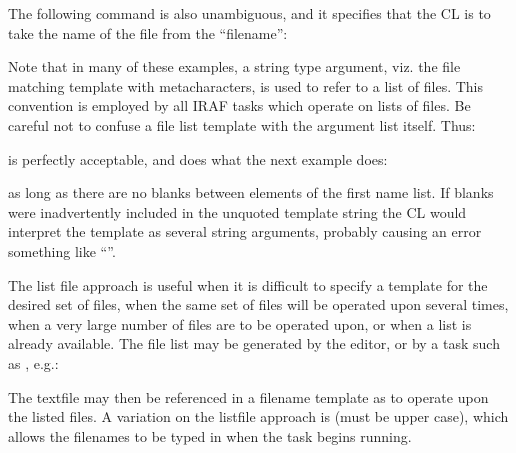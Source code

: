 The following command is also unambiguous, and it specifies that the CL
is to take the name of the file from the  ``filename'':

\begin{quotation}\noindent
{} 
\end{quotation}

Note that in many of these examples, a  string 
type argument, viz. the file matching template with metacharacters, 
is used to refer to a list of files.
This convention is employed by all IRAF tasks which
operate on lists of files.  Be careful not to confuse a file list template
with the argument list itself.  Thus:

\begin{quotation}\noindent
{} 
\end{quotation}

\noindent
is perfectly acceptable, and does what the next example does:

\begin{quotation}\noindent
{} 
\end{quotation}

\noindent
as long as there are no blanks between elements of the first name list.
If blanks were inadvertently included in the unquoted template string the
CL would interpret the template as several string arguments, probably causing
an error something like ``''.

The list file approach is useful when it is difficult to specify a template
for the desired set of files, when the same set of files will be operated
upon several times, when a very large number of files are to be operated
upon, or when a list is already available.  The file list may be generated
by the editor, or by a task such as , e.g.:

\begin{quotation}\noindent
{} 
\end{quotation}

\noindent
The textfile  may then be referenced in a filename template
as  to operate upon the listed files.  A variation on
the listfile approach is  (must be upper case), which
allows the filenames to be typed in when the task begins running.

